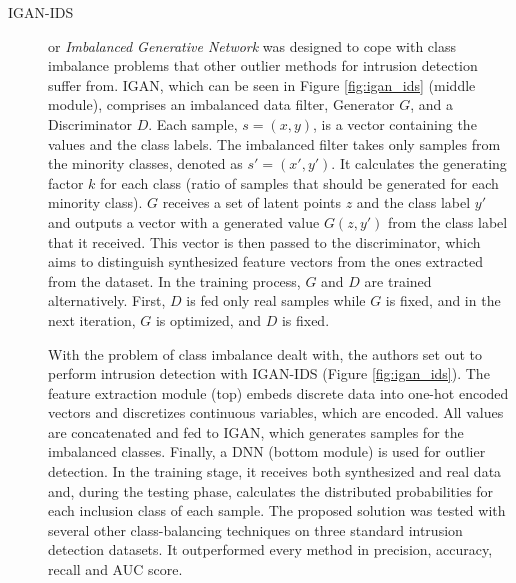 \begin{description}
    \item[IGAN-IDS \cite{huang.etal_IGAN_2020}] or \textit{Imbalanced Generative Network} was designed to cope with class imbalance problems that other outlier methods for intrusion detection suffer from. IGAN, which can be seen in Figure \ref{fig:igan_ids} (middle module), comprises an imbalanced data filter, Generator $G$, and a Discriminator $D$. Each sample, $s=(x,y)$, is a vector containing the values and the class labels. The imbalanced filter takes only samples from the minority classes, denoted as $s'=(x', y')$. It calculates the generating factor $k$ for each class (ratio of samples that should be generated for each minority class).  $G$ receives a set of latent points $z$ and the class label $y'$ and outputs a vector with a generated value $G(z,y')$ from the class label that it received. This vector is then passed to the discriminator, which aims to distinguish synthesized feature vectors from the ones extracted from the dataset. In the training process, $G$ and $D$ are trained alternatively. First, $D$ is fed only real samples while $G$ is fixed, and in the next iteration, $G$ is optimized, and $D$ is fixed. 
    
    With the problem of class imbalance dealt with, the authors set out to perform intrusion detection with IGAN-IDS (Figure \ref{fig:igan_ids}). The feature extraction module (top) embeds discrete data into one-hot encoded vectors and discretizes continuous variables, which are encoded. All values are concatenated and fed to IGAN, which generates samples for the imbalanced classes. Finally, a DNN (bottom module) is used for outlier detection. In the training stage, it receives both synthesized and real data and, during the testing phase, calculates the distributed probabilities for each inclusion class of each sample. The proposed solution was tested with several other class-balancing techniques on three standard intrusion detection datasets. It outperformed every method in precision, accuracy, recall and AUC score.
\end{description}


